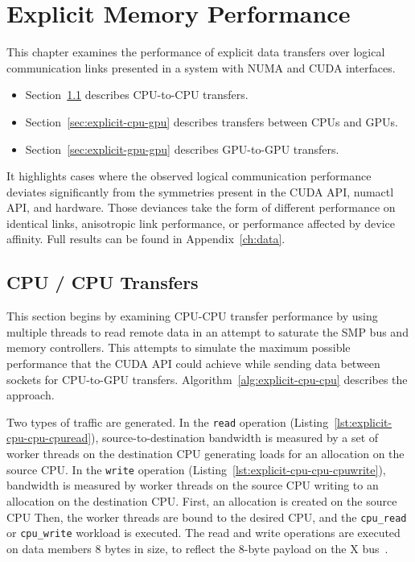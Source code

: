\chapter{Explicit Memory Performance}
\label{ch:explicit}

This chapter examines the performance of explicit data transfers over logical communication links presented in a system with NUMA and CUDA interfaces.
\begin{itemize}
    \item Section~\ref{sec:explicit-cpu-cpu} describes CPU-to-CPU transfers.
    \item Section~\ref{sec:explicit-cpu-gpu} describes transfers between CPUs and GPUs.
    \item Section~\ref{sec:explicit-gpu-gpu} describes GPU-to-GPU transfers.
\end{itemize}
It highlights cases where the observed logical communication performance deviates significantly from the symmetries present in the CUDA API, numactl API, and hardware.
Those deviances take the form of different performance on identical links, anisotropic link performance, or performance affected by device affinity.
Full results can be found in Appendix~\ref{ch:data}.

\section{CPU / CPU Transfers}
\label{sec:explicit-cpu-cpu}

This section begins by examining CPU-CPU transfer performance by using multiple threads to read remote data in an attempt to saturate the SMP bus and memory controllers.
This attempts to simulate the maximum possible performance that the CUDA API could achieve while sending data between sockets for CPU-to-GPU transfers.
Algorithm~\ref{alg:explicit-cpu-cpu} describes the approach.

Two types of traffic are generated.
In the \texttt{read} operation (Listing~\ref{lst:explicit-cpu-cpu-cpuread}), source-to-destination bandwidth is measured by a set of worker threads on the destination CPU generating loads for an allocation on the source CPU.
In the \texttt{write} operation (Listing~\ref{lst:explicit-cpu-cpu-cpuwrite}), bandwidth is measured by worker threads on the source CPU writing to an allocation on the destination CPU.
First, an allocation is created on the source CPU
Then, the worker threads are bound to the desired CPU, and the \texttt{cpu\_read} or \texttt{cpu\_write} workload is executed.
The read and write operations are executed on data members 8 bytes in size, to reflect the 8-byte payload on the X bus~\cite{caldeira2016s822lc}.

